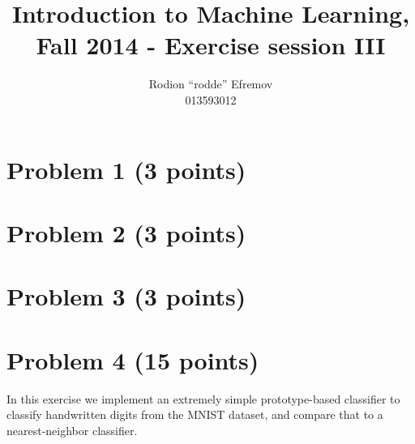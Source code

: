 \documentclass[10pt]{article}
\title{Introduction to Machine Learning, Fall 2014 - Exercise session III}
\author{Rodion ``rodde'' Efremov \\ 013593012}
\begin{document}
 \maketitle

\color{blue}
\section*{Problem 1 (3 points)}

\color{blue}
\section*{Problem 2 (3 points)}

\color{blue}
\section*{Problem 3 (3 points)}

\color{blue}
\section*{Problem 4 (15 points)}
In this exercise we implement an extremely simple prototype-based classifier to classify handwritten digits from the MNIST dataset, and compare that to a nearest-neighbor classifier.
\end{document}
